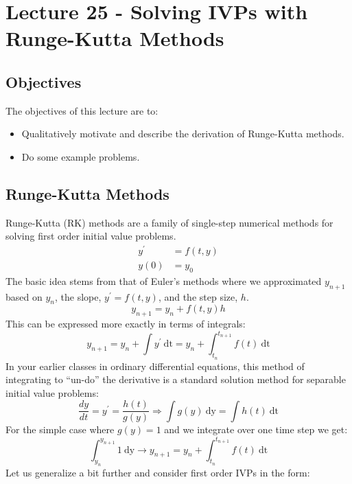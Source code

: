 \chapter{Lecture 25 - Solving IVPs with Runge-Kutta Methods}
\label{ch:lec25n}
\section{Objectives}
The objectives of this lecture are to:
\begin{itemize}
\item Qualitatively motivate and describe the derivation of Runge-Kutta methods.
\item Do some example problems.
\end{itemize}
\setcounter{lstannotation}{0}

\section{Runge-Kutta Methods}
Runge-Kutta (RK) methods are a family of single-step numerical methods for solving first order initial value problems.
\begin{align*}
y^{\prime} &= f(t,y) \\
y(0) &= y_0
\end{align*}
The basic idea stems from that of Euler's methods where we approximated $y_{n+1}$ based on $y_n$, the slope, $y^{\prime}=f(t,y)$, and the step size, $h$.
\begin{equation*}
y_{n+1} = y_n + f(t,y)h
\end{equation*}
This can be expressed more exactly in terms of integrals:
\begin{equation*}
y_{n+1}=y_n+\int y^{\prime} \ \text{dt} = y_n+\int_{t_{n}}^{t_{n+1}}  f(t) \ \text{dt}
\end{equation*}
In your earlier classes in ordinary differential equations, this method of integrating to ``un-do'' the derivative is a standard solution method for separable initial value problems:
\begin{equation*}
\frac{dy}{dt} = y^{\prime} = \frac{h(t)}{g(y)} \Rightarrow \int g(y) \ \text{dy} = \int h(t) \ \text{dt}
\end{equation*}
For the simple case where $g(y) = 1$ and we integrate over one time step we get:
\begin{equation*}
\int_{y_{n}}^{y_{n+1}} 1 \ \text{dy} \rightarrow y_{n+1} = y_n + \int_{t_n}^{t_{n+1}} f(t)\ \text{dt}
\end{equation*}
Let us generalize a bit further and consider first order IVPs in the form:
